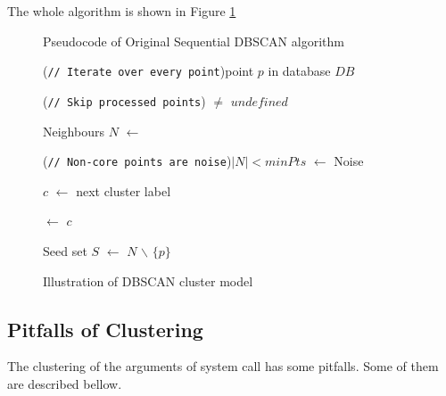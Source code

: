 	The whole algorithm is shown in Figure \ref{dbscan_ilustration}
	\nopagebreak
	\begin{figure}
		\begin{algorithm}[H]
			\caption{Pseudocode of Original Sequential DBSCAN algorithm}






			\ForEach(\hfill\texttt{// Iterate over every point}){point $p$ in database $DB$}{
				\lIf(\hfill\texttt{// Skip processed points}){\label{$p$} $\neq$ $undefined$}{
					\Continue
				}

			Neighbours $N$ $\leftarrow$ 

			\If(\hfill\texttt{// Non-core points are noise}){$\left|N\right| < minPts$}{
				\label{$p$} $\leftarrow$ Noise
				\Continue
			}

			$c$ $\leftarrow$ next cluster label 

			\label{$p$} $\leftarrow$ $c$

			Seed set $S$ $\leftarrow$ $N$ $\backslash$ $\{p\}$ 

		}

		\end{algorithm}
		\caption{Illustration of DBSCAN cluster model}
		\label{dbscan_ilustration}
	\end{figure}


\subsection{Pitfalls of Clustering}
The clustering of the arguments of system call has some pitfalls.
Some of them are described bellow.

